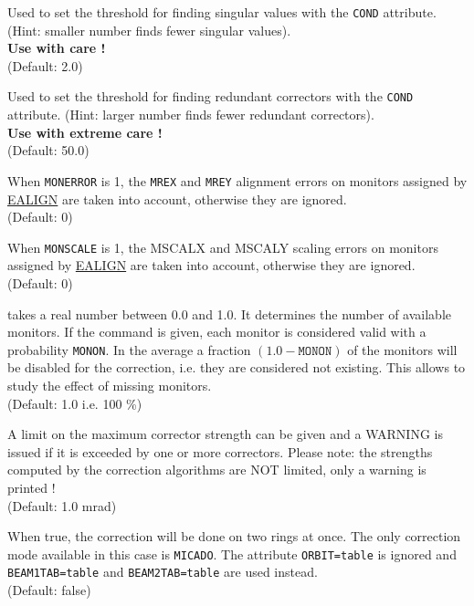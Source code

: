 \begin{madlist}
     Used to set the threshold for finding singular values
     with the {\tt COND} attribute. (Hint: smaller number finds fewer singular
     values).  
     \\ {\bf Use with care ! }
     \\ (Default: 2.0)

     Used to set the threshold for finding redundant
     correctors with the {\tt COND} attribute. (Hint: larger number finds fewer
     redundant correctors).  
     \\ {\bf Use with extreme care ! }
     \\ (Default: 50.0) 

    When {\tt MONERROR} is 1, the {\tt MREX} and {\tt MREY} 
     alignment errors on monitors assigned  by \hyperref[sec:ealign]{EALIGN} 
     are taken into account, otherwise they are ignored.
     \\ (Default: 0)

    When {\tt MONSCALE} is 1, the MSCALX and
     MSCALY scaling errors on monitors assigned  by \hyperref[sec:ealign]{EALIGN}  
     are taken into account, otherwise they are ignored.
     \\ (Default: 0)

    takes a real number between 0.0 and 1.0. It
     determines the number of available monitors. If the command is
     given, each monitor is considered valid with a probability
     {\tt MONON}. In the average a fraction $(1.0 - \texttt{MONON})$ 
     of the monitors will be disabled for the correction, i.e. they are 
     considered not existing.  This allows to study the effect of missing monitors.
     \\ (Default: 1.0 i.e. 100 \%) 

     A limit on the maximum corrector strength can be
     given and a WARNING is issued if it is exceeded by one or more
     correctors.  Please note: the strengths computed by the correction
     algorithms are NOT limited, only a warning is printed ! 
     \\ (Default: 1.0 mrad)

    When true, the correction will be done on two rings at
     once. The only correction mode available in this case is
     {\tt MICADO}. The attribute {\tt ORBIT=table} is ignored and {\tt BEAM1TAB=table} and
     {\tt BEAM2TAB=table} are used instead.  
     \\ (Default: false)


\end{madlist}
